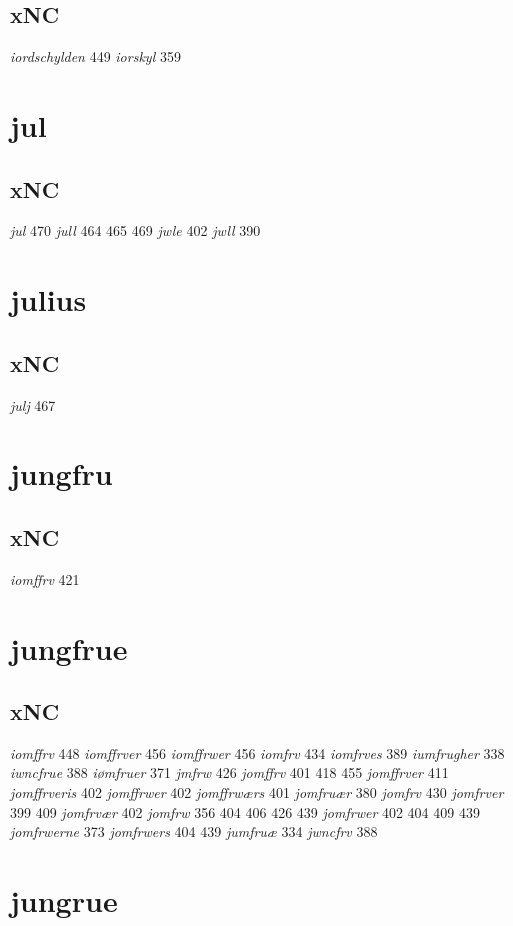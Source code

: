 \documentclass[a4paper,twocolumn]{article}
\begin{document}
\subsection{xNC}
\label{sec:orgff2dae0}
\emph{iordschylden} 449 \emph{iorskyl} 359 
\section{jul}
\label{sec:org2ab0b3f}
\subsection{xNC}
\label{sec:orgc291c36}
\emph{jul} 470 \emph{jull} 464 465 469 \emph{jwle} 402 \emph{jwll} 390 
\section{julius}
\label{sec:org87be3d6}
\subsection{xNC}
\label{sec:org2c8df70}
\emph{julj} 467 
\section{jungfru}
\label{sec:orge5dbe8f}
\subsection{xNC}
\label{sec:org67c6cf5}
\emph{iomffrv} 421 
\section{jungfrue}
\label{sec:orgf8aed45}
\subsection{xNC}
\label{sec:orge06b5d6}
\emph{iomffrv} 448 \emph{iomffrver} 456 \emph{iomffrwer} 456 \emph{iomfrv} 434 \emph{iomfrves} 389 \emph{iumfrugher} 338 \emph{iwncfrue} 388 \emph{iømfruer} 371 \emph{jmfrw} 426 \emph{jomffrv} 401 418 455 \emph{jomffrver} 411 \emph{jomffrveris} 402 \emph{jomffrwer} 402 \emph{jomffrwærs} 401 \emph{jomfruær} 380 \emph{jomfrv} 430 \emph{jomfrver} 399 409 \emph{jomfrvær} 402 \emph{jomfrw} 356 404 406 426 439 \emph{jomfrwer} 402 404 409 439 \emph{jomfrwerne} 373 \emph{jomfrwers} 404 439 \emph{jumfruæ} 334 \emph{jwncfrv} 388 
\section{jungrue}
\label{sec:org7ba276b}
\end{document}
